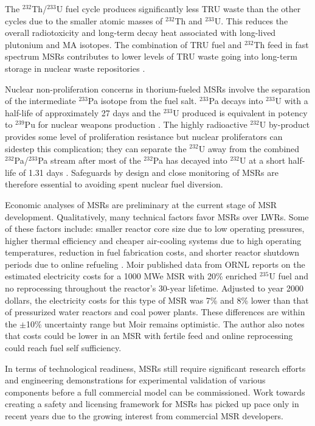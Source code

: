 The $^{232}$Th/$^{233}$U fuel cycle produces significantly less \gls{TRU}
waste than the other cycles due to the smaller atomic masses of $^{232}$Th and
$^{233}$U. This reduces the overall radiotoxicity and long-term decay heat
associated with long-lived plutonium and \gls{MA} isotopes. The combination
of \gls{TRU} fuel and $^{232}$Th feed in fast spectrum \glspl{MSR} contributes
to lower levels of \gls{TRU} waste going into long-term storage in
nuclear waste repositories \cite{merle-lucotte_launching_2011}.

Nuclear non-proliferation concerns in thorium-fueled \glspl{MSR} involve the
separation of the intermediate $^{233}$Pa
isotope from the fuel salt. $^{233}$Pa decays into $^{233}$U with a half-life
of approximately 27 days and the $^{233}$U produced is equivalent in potency
to $^{239}$Pu for nuclear weapons production \cite{grape_10_2017}. The highly
radioactive $^{232}$U
by-product provides some level of proliferation resistance but nuclear
proliferators can sidestep this complication; they can
separate the $^{232}$U away from the combined $^{232}$Pa/$^{233}$Pa stream
after most of the $^{232}$Pa has decayed into $^{232}$U at a short half-life
of 1.31 days \cite{grape_10_2017}. Safeguards by design and close monitoring
of \glspl{MSR} are therefore essential to avoiding spent nuclear fuel
diversion.

Economic analyses of \glspl{MSR} are preliminary at the current
stage of \gls{MSR} development. Qualitatively, many technical factors favor
\glspl{MSR} over \glspl{LWR}. Some of these factors include: smaller reactor
core size due to low operating pressures, higher thermal efficiency and
cheaper air-cooling systems due to high operating temperatures, reduction in
fuel fabrication costs, and shorter reactor shutdown periods due to online
refueling \cite{dolan_1_2017}. Moir \cite{moir_recommendations_2008}
published data from \gls{ORNL} reports on the estimated electricity costs for
a 1000 MWe \gls{MSR} with 20\% enriched $^{235}$U fuel and no reprocessing
throughout the reactor's 30-year lifetime. Adjusted to year 2000 dollars, the
electricity costs for this type of \gls{MSR} was 7\% and 8\% lower than that
of pressurized water reactors and coal power plants. These differences are
within the $\pm$10\% uncertainty range but Moir remains optimistic.
The author also notes that costs could be lower in an \gls{MSR} with
fertile feed and online reprocessing could reach fuel self sufficiency.

In terms of technological readiness, \glspl{MSR} still require significant
research efforts and engineering demonstrations for experimental validation of
various components before a full commercial model can be commissioned. Work
towards creating a safety and licensing framework for \glspl{MSR} has picked
up pace only in recent years due to the growing interest from commercial
\gls{MSR} developers.

